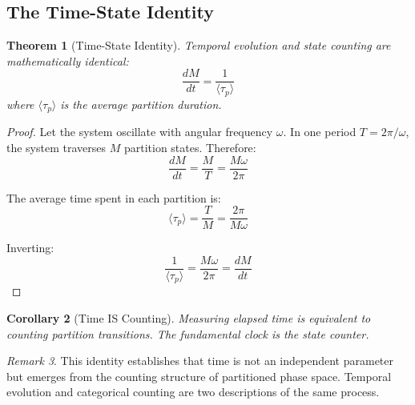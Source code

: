 \documentclass[twocolumn,10pt,a4paper]{article}
\newtheorem{theorem}{Theorem}[section]
\newtheorem{corollary}[theorem]{Corollary}
\theoremstyle{definition}
\theoremstyle{remark}
\newtheorem{remark}[theorem]{Remark}
\begin{document}
\subsection{The Time-State Identity}

\begin{theorem}[Time-State Identity]
\label{thm:time_state}
Temporal evolution and state counting are mathematically identical:
\begin{equation}
    \frac{dM}{dt} = \frac{1}{\langle\tau_p\rangle}
\end{equation}
where $\langle\tau_p\rangle$ is the average partition duration.
\end{theorem}

\begin{proof}
Let the system oscillate with angular frequency $\omega$. In one period $T = 2\pi/\omega$, the system traverses $M$ partition states. Therefore:
\begin{equation}
    \frac{dM}{dt} = \frac{M}{T} = \frac{M\omega}{2\pi}
\end{equation}

The average time spent in each partition is:
\begin{equation}
    \langle\tau_p\rangle = \frac{T}{M} = \frac{2\pi}{M\omega}
\end{equation}

Inverting:
\begin{equation}
    \frac{1}{\langle\tau_p\rangle} = \frac{M\omega}{2\pi} = \frac{dM}{dt}
\end{equation}
\end{proof}

\begin{corollary}[Time IS Counting]
Measuring elapsed time is equivalent to counting partition transitions. The fundamental clock is the state counter.
\end{corollary}

\begin{remark}
This identity establishes that time is not an independent parameter but emerges from the counting structure of partitioned phase space. Temporal evolution and categorical counting are two descriptions of the same process.
\end{remark}
\end{document}
